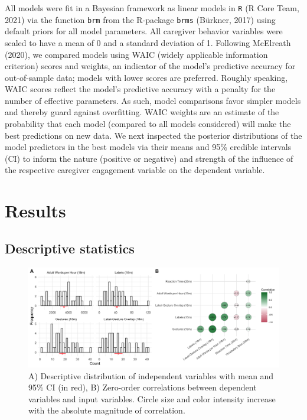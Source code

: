 \documentclass[
  english,
  man,floatsintext]{apa6}
\begin{document}
All models were fit in a Bayesian framework as linear models in \texttt{R} (R Core Team, 2021) via the function \texttt{brm} from the R-package \texttt{brms} (Bürkner, 2017) using default priors for all model parameters. All caregiver behavior variables were scaled to have a mean of 0 and a standard deviation of 1. Following McElreath (2020), we compared models using WAIC (widely applicable information criterion) scores and weights, an indicator of the model's predictive accuracy for out-of-sample data; models with lower scores are preferred. Roughly speaking, WAIC scores reflect the model's predictive accuracy with a penalty for the number of effective parameters. As such, model comparisons favor simpler models and thereby guard against overfitting. WAIC weights are an estimate of the probability that each model (compared to all models considered) will make the best predictions on new data. We next inspected the posterior distributions of the model predictors in the best models via their means and 95\% credible intervals (CI) to inform the nature (positive or negative) and strength of the influence of the respective caregiver engagement variable on the dependent variable.

\hypertarget{results}{%
\section{Results}\label{results}}

\hypertarget{descriptive-statistics}{%
\subsection{Descriptive statistics}\label{descriptive-statistics}}

\begin{figure}
\includegraphics[width=1\linewidth]{../stats/figures/fig.1ab} \caption{A) Descriptive distribution of independent variables with mean and 95\% CI (in red), B) Zero-order correlations between dependent variables and input variables. Circle size and color intensity increase with the absolute magnitude of correlation.}\label{fig:fig2}
\end{figure}
\end{document}
